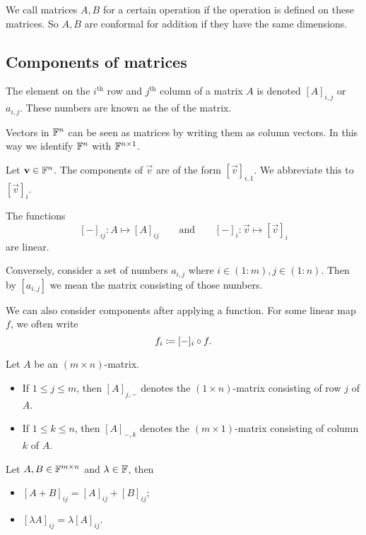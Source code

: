 \begin{definition}
We call matrices $A,B$  for a certain operation if the operation is defined on these matrices. So $A,B$ are conformal for addition if they have the same dimensions. 
\end{definition}

\subsection{Components of matrices}
The element on the $i^\text{th}$ row and $j^\text{th}$ column of a matrix $A$ is denoted $[A]_{i,j}$ or $a_{i,j}$. These numbers are known as the  of the matrix.

Vectors in $\mathbb{F}^n$ can be seen as matrices by writing them as column vectors. In this way we identify $\mathbb{F}^n$ with $\mathbb{F}^{n\times 1}$.

Let $\bm{\mathrm{v}}\in \mathbb{F}^n$. The components of $\vec{v}$ are of the form $[\vec{v}]_{i,1}$. We abbreviate this to $[\vec{v}]_i$.

\begin{lemma}
The functions
\[ [-]_{ij}: A\mapsto [A]_{ij} \qquad \text{and} \qquad [-]_i: \vec{v}\mapsto [\vec{v}]_i  \]
are linear.
\end{lemma}

Conversely, consider a set of numbers $a_{i,j}$ where $i\in (1:m), j\in (1:n)$. Then by $[a_{i,j}]$ we mean the matrix consisting of those numbers.

We can also consider components after applying a function. For some linear map $f$, we often write
\[ f_i \coloneqq [-]_i\circ f. \]

\begin{definition}
Let $A$ be an $(m\times n)$-matrix.
\begin{itemize}
\item If $1\leq j\leq m$, then $[A]_{j,-}$ denotes the $(1\times n)$-matrix consisting of row $j$ of $A$.
\item If $1\leq k\leq n$, then $[A]_{-,k}$ denotes the $(m\times 1)$-matrix consisting of column $k$ of $A$.
\end{itemize}
\end{definition}

\begin{lemma}
Let $A,B\in \mathbb{F}^{m\times n}$ and $\lambda\in \mathbb{F}$, then
\begin{itemize}
\item $[A+B]_{ij} = [A]_{ij} + [B]_{ij}$;
\item $[\lambda A]_{ij} = \lambda[A]_{ij}$.
\end{itemize}
\end{lemma}


